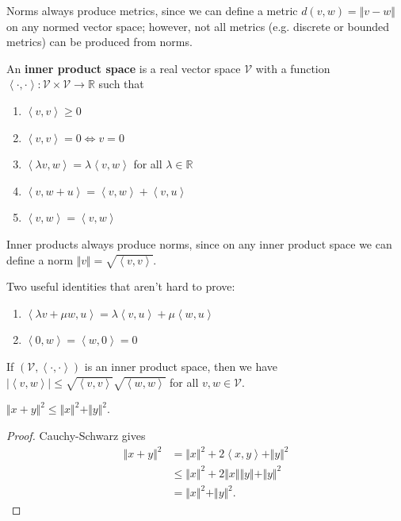 \documentclass[twoside,10pt]{report}
\begin{document}
Norms always produce metrics, since we can define a metric $d(v,w)=\Vert{v-w}\Vert$ on any normed vector space; however, not all metrics (e.g. discrete or bounded metrics) can be produced from norms.

\begin{defn}[]
	An \textbf{inner product space} is a real vector space $\mathcal{V}$ with a function $\left\langle \cdot,\cdot \right\rangle:\mathcal{V}\times\mathcal{V}\to\mathbb{R}$ such that
	\begin{enumerate}
		\item $\left\langle v,v \right\rangle\geq 0$ 
		\item $\left\langle v,v \right\rangle=0 \iff v=0$ 
		\item $\left\langle \lambda v,w \right\rangle= \lambda \left\langle v,w \right\rangle$ for all $\lambda \in \mathbb{R}$ 
		\item $\left\langle v,w+u \right\rangle=\left\langle v,w \right\rangle+\left\langle v,u \right\rangle$ 
		\item $\left\langle v,w \right\rangle=\left\langle v,w \right\rangle$
	\end{enumerate}
\end{defn}

Inner products always produce norms, since on any inner product space we can define a norm $\Vert{v}\Vert=\sqrt{\left\langle v,v \right\rangle}$.

Two useful identities that aren't hard to prove:
\begin{enumerate}
	\item $\left\langle \lambda v + \mu w, u \right\rangle=\lambda \left\langle v,u \right\rangle+\mu\left\langle w,u \right\rangle$ 
	\item $\left\langle 0,w \right\rangle=\left\langle w,0 \right\rangle=0$
\end{enumerate}

\begin{prop}
	If $(\mathcal{V},\left\langle \cdot,\cdot \right\rangle)$ is an inner product space, then we have $|\left\langle v,w \right\rangle| \leq \sqrt{\left\langle v,v \right\rangle} \sqrt{\left\langle w,w \right\rangle}$ for all $v,w \in \mathcal{V}$.
\end{prop}

\begin{prop}
	$\Vert{x+y}\Vert^2 \leq \Vert{x}\Vert^2 + \Vert{y}\Vert^2$.
\end{prop}
\begin{proof}
	Cauchy-Schwarz gives
	\begin{align*}
		\Vert{x+y}\Vert^2 &= \Vert{x}\Vert^2 + 2\left\langle x,y \right\rangle + \Vert{y}\Vert^2 \\
				  &\leq \Vert{x}\Vert^2 + 2\Vert{x}\Vert\Vert{y}\Vert + \Vert{y}\Vert^2 \\
				  &= \Vert{x}\Vert^2 + \Vert{y}\Vert^2.
	\end{align*}
\end{proof}
\end{document}
